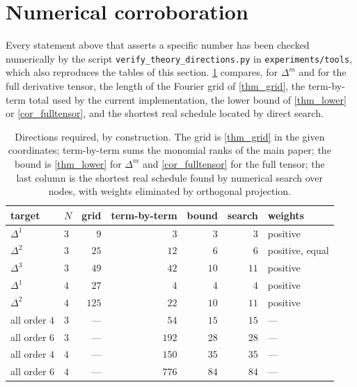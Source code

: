 \documentclass[final]{siamltex}
\begin{document}
\section{Numerical corroboration}\label{sec_numerics}

Every statement above that asserts a specific number has been checked
numerically by the script \texttt{verify\_theory\_directions.py} in
\texttt{experiments/tools}, which also
reproduces the tables of this section.  \cref{tab_numbers} compares, for
$\Delta^{m}$ and for the full derivative tensor, the length of the Fourier grid
of \cref{thm_grid}, the term-by-term total used by the current implementation,
the lower bound of \cref{thm_lower} or \cref{cor_fulltensor}, and the shortest
real schedule located by direct search.

\begin{table}[t]
\caption{Directions required, by construction.  The grid is
\cref{thm_grid} in the given coordinates; term-by-term sums the monomial ranks of
the main paper; the bound is \cref{thm_lower} for $\Delta^{m}$ and
\cref{cor_fulltensor} for the full tensor; the last column is the shortest real
schedule found by numerical search over nodes, with weights eliminated by
orthogonal projection.}
\label{tab_numbers}
\centering
\begin{tabular}{llrrrrl}
\toprule
target & $N$ & grid & term-by-term & bound & search & weights \\
\midrule
$\Delta^{1}$ & $3$ & $9$   & $3$   & $3$  & $3$  & positive \\
$\Delta^{2}$ & $3$ & $25$  & $12$  & $6$  & $6$  & positive, equal \\
$\Delta^{3}$ & $3$ & $49$  & $42$  & $10$ & $11$ & positive \\
$\Delta^{1}$ & $4$ & $27$  & $4$   & $4$  & $4$  & positive \\
$\Delta^{2}$ & $4$ & $125$ & $22$  & $10$ & $11$ & positive \\
\midrule
all order $4$ & $3$ & --- & $54$  & $15$ & $15$ & --- \\
all order $6$ & $3$ & --- & $192$ & $28$ & $28$ & --- \\
all order $4$ & $4$ & --- & $150$ & $35$ & $35$ & --- \\
all order $6$ & $4$ & --- & $776$ & $84$ & $84$ & --- \\
\bottomrule
\end{tabular}
\end{table}
\end{document}
